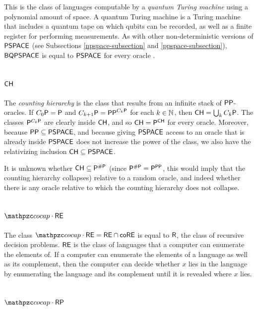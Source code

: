 This is the class of languages computable by a \textit{quantum Turing machine} 
using a polynomial amount of space. A quantum Turing machine is a Turing machine 
that includes a quantum tape on which qubits can be recorded, as well as a finite 
register for performing measurements. As with other non-deterministic versions of 
$\mathsf{PSPACE}$ (see Subsections \ref{npspace-subsection} and 
\ref{ppspace-subsection}), $\mathsf{BQPSPACE}$ is equal to $\mathsf{PSPACE}$ for every 
oracle \cite{watrous2003complexity}.

\subsection{$\mathsf{CH}$}

The \textit{counting hierarchy} is the class that results from an infinite stack
of $\mathsf{PP}$-oracles. If $C_0\mathsf{P}=\mathsf{P}$ and $C_{k+1}\mathsf{P}=\mathsf{PP}^{C_k\mathsf{P}}$ for 
each $k\in\mathbb{N}$, then $\mathsf{CH}=\bigcup_kC_k\mathsf{P}$. The classes $\mathsf{P}^{C_k\mathsf{P}}$ are 
clearly inside $\mathsf{CH}$, and so $\mathsf{CH}=\mathsf{P}^{\mathsf{CH}}$ for every oracle. 
Moreover, because $\mathsf{PP}\subseteq\mathsf{PSPACE}$, and because giving 
$\mathsf{PSPACE}$ access to an oracle that is already inside $\mathsf{PSPACE}$ does 
not increase the power of the class, we also have the relativizing inclusion 
$\mathsf{CH}\subseteq\mathsf{PSPACE}$.

It is unknown whether $\mathsf{CH}\subseteq\mathsf{P}^{\#\mathsf{P}}$ (since 
$\mathsf{P}^{\#\mathsf{P}}=\mathsf{P}^{\mathsf{PP}}$, this would imply that the counting hierarchy 
collapses) relative to a random oracle, and indeed whether there is any oracle 
relative to which the counting hierarchy does not collapse.

\subsection{$\cocap\cdot\msf{RE}$}

The class $\cocap\cdot\msf{RE}=\msf{RE}\cap\co\msf{RE}$ is equal to $\mathsf{R}$, 
the class of recursive decision problems. $\mathsf{RE}$ is the class of languages 
that a computer can enumerate the elements of. If a computer can enumerate the 
elements of a language as well as its complement, then the computer can decide 
whether $x$ lies in the language by enumerating the language and its complement 
until it is revealed where $x$ lies.

\subsection{$\cocap\cdot\msf{RP}$}

